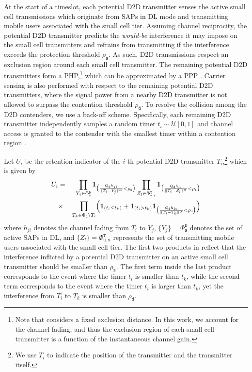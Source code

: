 \documentclass[twocolumn,english]{IEEEtran}
\theoremstyle{plain}
\theoremstyle{definition}
\begin{document}
At the start of a timeslot, each potential D2D transmitter senses
the active small cell transmissions which originate from SAPs in DL
mode and transmitting mobile users associated with the small cell
tier. Assuming channel reciprocity, the potential D2D transmitter
predicts the \emph{would-be }interference it may impose on the small
cell transmitters and refrains from transmitting if the interference
exceeds the protection threshold $\rho_{\mathtt{s}}$. As such, D2D
transmissions respect an exclusion region around each small cell transmitter.
The remaining potential D2D transmitters form a PHP,\emph{}\footnote{Note that \cite{IAOI} considers a fixed exclusion distance. In this
work, we account for the channel fading, and thus the exclusion region
of each small cell transmitter is a function of the instantaneous
channel gain.} which can be approximated by a PPP \cite{IAOI}. Carrier sensing
is also performed with respect to the remaining potential D2D transmitters,
where the signal power from a nearby D2D transmitter is not allowed
to surpass the contention threshold $\rho_{\mathtt{d}}$. To resolve
the collision among the D2D contenders, we use a back-off scheme.
Specifically, each remaining D2D transmitter independently samples
a random timer $t_{i}\sim\mathcal{U}[0,1]$ and channel access is
granted to the contender with the smallest timer within a contention
region \cite{ASGM}.

Let $U_{i}$ be the retention indicator of the $i$-th potential D2D
transmitter $T_{i}$,\footnote{We use $T_{i}$ to indicate the position of the transmitter and the
transmitter itself.} which is given by
\begin{eqnarray}
U_{i} & = & \prod_{Y_{j}\in\Phi_{\mathtt{s}}^{\mathtt{D}}}\mathbf{1}_{\bigl(\frac{Q_{\mathtt{d}}h_{ji}}{\Vert T_{i}-Y_{j}\Vert^{\alpha}}<\rho_{\mathtt{s}}\bigr)}\prod_{Z_{l}\in\Phi_{\mathtt{u},\mathtt{s}}^{\mathtt{T}}}\mathbf{1}_{\bigl(\frac{Q_{\mathtt{d}}h_{li}}{\Vert T_{i}-Z_{l}\Vert^{\alpha}}<\rho_{\mathtt{s}}\bigr)}\nonumber \\
 & \times & \prod_{T_{k}\in\Phi_{\mathtt{d}}\backslash T_{i}}\Bigl(\mathbf{1}_{\left(t_{i}\leq t_{k}\right)}+\mathbf{1}_{\left(t_{i}>t_{k}\right)}\mathbf{1}_{\bigl(\frac{Q_{\mathtt{d}}h_{ki}}{\Vert T_{i}-T_{k}\Vert^{\alpha}}<\rho_{\mathtt{d}}\bigr)}\Bigr)\label{eq:(6)}
\end{eqnarray}
where $h_{ji}$ denotes the channel fading from $T_{i}$ to $Y_{j}$,
$\{Y_{j}\}=\Phi_{\mathtt{s}}^{\mathtt{D}}$ denotes the set of active
SAPs in DL, and $\{Z_{l}\}=\Phi_{\mathtt{u},\mathtt{s}}^{\mathtt{T}}$
represents the set of transmitting mobile users associated with the
small cell tier. The first two products in  reflect
that the interference inflicted by a potential D2D transmitter on
an active small cell transmitter should be smaller than $\rho_{\mathtt{s}}$.
The first term inside the last product corresponds to the event where
the timer $t_{i}$ is smaller than $t_{k}$, while the second term
corresponds to the event where the timer $t_{i}$ is larger than $t_{k}$,
yet the interference from $T_{i}$ to $T_{k}$ is smaller than $\rho_{\mathtt{d}}$.
\end{document}
